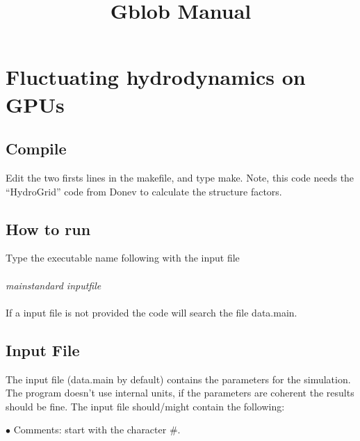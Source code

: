 \documentclass[aps,prl]{revtex4}
\begin{document}
\setlength{\parindent}{0cm}

\title{ Gblob Manual}


\section{Fluctuating hydrodynamics on GPUs}
\subsection{Compile}
Edit the two firsts lines in the makefile, and type make. Note, this code needs the
``HydroGrid'' code from Donev to calculate the structure factors.
\subsection{How to run}
Type the executable name following with the input file \\ \\
\emph{mainstandard inputfile} \\ \\
If a input file is not provided the code will search the file data.main.

\subsection{Input File}
The input file (data.main by default) contains the parameters for the 
simulation. The program doesn't use internal units, if the parameters are coherent the results
should be fine. The input file should/might contain the following:

$\bullet$ Comments: start with the character \#. \\
\end{document}
